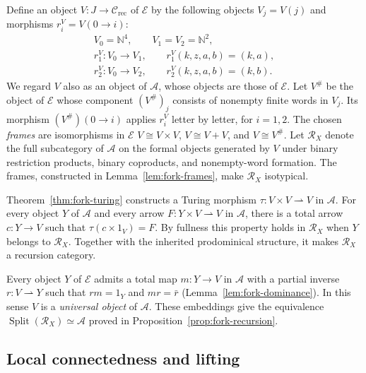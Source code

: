 \documentclass[11pt]{article}
\newcommand{\N}{\mathbb N}
\begin{document}
Define an object $V:J\to\mathcal C_{\mathrm{rec}}$ of $\mathcal E$
by the following objects $V_j=V(j)$ and morphisms
$r_i^V=V(0\to i)$:
\begin{equation}\label{eq:universal-fork}
 \begin{gathered}
 V_0=\N^4,\qquad V_1=V_2=\N^2,\\
 r_1^V:V_0\to V_1,\qquad r_1^V(k,z,a,b)=(k,a),\\
 r_2^V:V_0\to V_2,\qquad r_2^V(k,z,a,b)=(k,b).
 \end{gathered}
\end{equation}
We regard $V$ also as an object of $\mathcal A$, whose objects
are those of $\mathcal E$. Let $V^\#$ be the object of
$\mathcal E$ whose component $(V^\#)_j$ consists of nonempty
finite words in $V_j$. Its morphism $(V^\#)(0\to i)$ applies
$r_i^V$ letter by letter, for $i=1,2$.
The chosen \emph{frames} are isomorphisms in $\mathcal E$
$V\cong V\times V$, $V\cong V+V$, and $V\cong V^\#$.
Let $\mathscr R_X$ denote the full subcategory of $\mathcal A$
on the formal objects generated by $V$ under binary restriction
products, binary coproducts, and nonempty-word formation.
The frames, constructed in Lemma~\ref{lem:fork-frames}, make
$\mathscr R_X$ isotypical.

Theorem~\ref{thm:fork-turing} constructs a Turing morphism
$\tau:V\times V\rightharpoonup V$ in $\mathcal A$.
For every object $Y$ of $\mathcal A$ and every arrow
$F:Y\times V\rightharpoonup V$ in $\mathcal A$, there is a
total arrow $c:Y\to V$ such that $\tau(c\times1_V)=F$.
By fullness this property holds in $\mathscr R_X$ when
$Y$ belongs to $\mathscr R_X$. Together with the inherited
prodominical structure, it makes $\mathscr R_X$ a recursion category.

Every object $Y$ of $\mathcal E$ admits a total map $m:Y\to V$ in
$\mathcal A$ with a partial inverse $r:V\rightharpoonup Y$
such that $rm=1_Y$ and $mr=\bar r$
(Lemma~\ref{lem:fork-dominance}). In this sense $V$ is a
\emph{universal object} of $\mathcal A$.
These embeddings give the equivalence
$\operatorname{Split}(\mathscr R_X)\simeq\mathcal A$
proved in Proposition~\ref{prop:fork-recursion}.

\subsection{Local connectedness and lifting}
\end{document}
